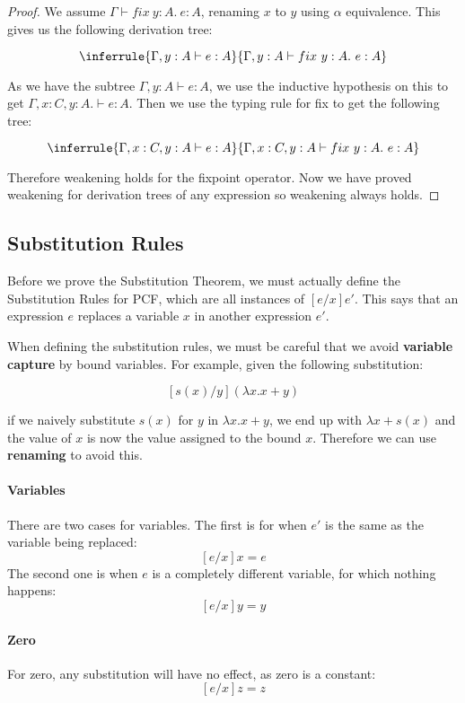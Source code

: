 \begin{proof}
We assume $\Gamma \vdash fix \ y :A. \ e: A$, renaming $x$ to $y$ using $\alpha$ equivalence. This gives us the following derivation tree:

$$
\inferrule{\Gamma, y:A \vdash e : A}{\Gamma, y : A \vdash fix \ y : A. \ e : A}
$$

As we have the subtree $\Gamma, y:A \vdash e : A$, we use the inductive hypothesis on this to get $\Gamma, x :C, y:A. \vdash e : A$. Then we use the typing rule for fix to get the following tree:

$$
\inferrule{\Gamma, x : C, y:A \vdash e : A}{\Gamma, x : C, y : A \vdash fix \ y : A. \ e : A}
$$

Therefore weakening holds for the fixpoint operator. Now we have proved weakening for derivation trees of any expression so weakening always holds.


\end{proof}


\subsection{Substitution Rules} 

Before we prove the Substitution Theorem, we must actually define the Substitution Rules for PCF, which are all instances of $[e/x]e'$. This says that an expression $e$ replaces a variable $x$ in another expression $e'$.

When defining the substitution rules, we must be careful  that we avoid \textbf{variable capture} by bound variables. For example, given the following substitution:

\[ [s(x)/y](\lambda x. x + y) \]

if we naively substitute $s(x)$ for $y$ in $\lambda x. x + y$, we end up with $\lambda x + s(x)$ and the value of $x$ is now the value assigned to the bound $x$. Therefore we can use \textbf{renaming} to avoid this. 

\paragraph {Variables} There are two cases for variables. The first is for when $e'$ is the same as the variable being replaced:
\[[e/x]x = e\]
The second one is when $e$ is a completely different variable, for which nothing happens:
\[ [e/x]y = y\]

\paragraph{Zero} For zero, any substitution will have no effect, as zero is a constant:
\[ [e/x]z = z\]

